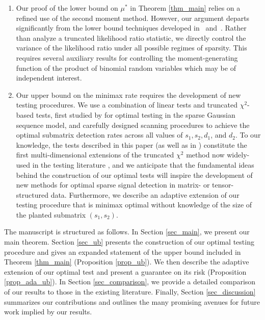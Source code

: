 \documentclass{article}
\theoremstyle{remark}
\begin{document}
\begin{enumerate}
     
     \item %
     Our proof of the lower bound on $\mu^*$ in Theorem \ref{thm_main} relies on a refined use of the second moment method. However, our argument departs significantly from the lower bound techniques developed in~\cite{butucea2013detection} and~\cite{arias2014community}. Rather than analyze a truncated likelihood ratio statistic, we directly control the variance of the likelihood ratio under all possible regimes of sparsity. This requires several auxiliary results for controlling the moment-generating function of the product of binomial random variables which may be of independent interest.

     \item Our upper bound on the minimax rate requires the development of new testing procedures. We use a combination of linear tests and truncated $\chi^2$-based tests, first studied by \citet{collier2017minimax} for optimal testing in the sparse Gaussian sequence model, and carefully designed scanning procedures to achieve the optimal submatrix detection rates across all values of $s_1, s_2, d_1$, and $d_2$. To our knowledge, the tests described in this paper (as well as in \citet{chhor2026optimal}) constitute the first multi-dimensional extensions of the truncated $\chi^2$ method now widely-used in the testing literature \citep{collier2017minimax, kotekal2023minimax, liu2021minimax, chhor2024sparse}, and we anticipate that the fundamental ideas behind the construction of our optimal tests will inspire the development of new methods for optimal sparse signal detection in matrix- or tensor-structured data. Furthermore, we describe an adaptive extension of our testing procedure that is minimax optimal without knowledge of the size of the planted submatrix $(s_1, s_2)$.
 \end{enumerate}


The manuscript is structured as follows. In Section \ref{sec_main}, we present our main theorem. Section \ref{sec_ub} presents the construction of our optimal testing procedure and gives an expanded statement of the upper bound included in Theorem \ref{thm_main} (Proposition \ref{prop_ub}). We then describe the adaptive extension of our optimal test and present a guarantee on its risk (Proposition \ref{prop_ada_ub}). In Section \ref{sec_comparison}, we provide a detailed comparison of our results to those in the existing literature. Finally, Section \ref{sec_discussion} summarizes our contributions and outlines the many promising avenues for future work implied by our results.
\end{document}
